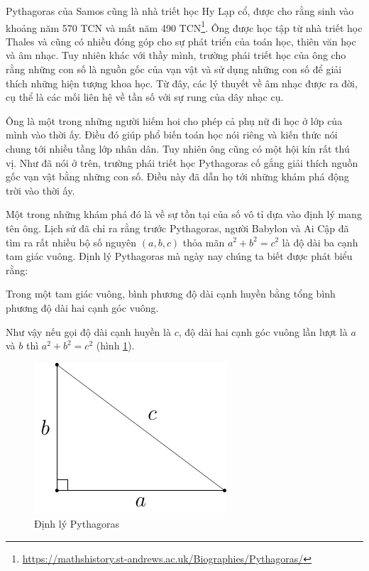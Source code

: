 Pythagoras của Samos cũng là nhà triết học Hy Lạp cổ, được cho rằng sinh vào khoảng năm 570 TCN và mất năm  490 TCN\footnote{\url{https://mathshistory.st-andrews.ac.uk/Biographies/Pythagoras/}}. Ông được học tập từ nhà triết học Thales và cũng có nhiều đóng góp cho sự phát triển của toán học, thiên văn học và âm nhạc. Tuy nhiên khác với thầy mình, trường phái triết học của ông cho rằng những con số là nguồn gốc của vạn vật và sử dụng những con số để giải thích những hiện tượng khoa học. Từ đây, các lý thuyết về âm nhạc được ra đời, cụ thể là các mối liên hệ về tần số với sự rung của dây nhạc cụ.

Ông là một trong những người hiếm hoi cho phép cả phụ nữ đi học ở lớp của mình vào thời ấy. Điều đó giúp phổ biến toán học nói riêng và kiến thức nói chung tới nhiều tầng lớp nhân dân. Tuy nhiên ông cũng có một hội kín rất thú vị. Như đã nói ở trên, trường phái triết học Pythagoras cố gắng giải thích nguồn gốc vạn vật bằng những con số. Điều này đã dẫn họ tới những khám phá động trời vào thời ấy.

Một trong những khám phá đó là về sự tồn tại của số vô tỉ dựa vào định lý mang tên ông. Lịch sử đã chỉ ra rằng trước Pythagoras, người Babylon và Ai Cập đã tìm ra rất nhiều bộ số nguyên $(a, b, c)$ thỏa mãn $a^2 + b^2 = c^2$ là độ dài ba cạnh tam giác vuông. Định lý Pythagoras mà ngày nay chúng ta biết được phát biểu rằng:

\begin{theorem}
    Trong một tam giác vuông, bình phương độ dài cạnh huyền bằng tổng bình phương độ dài hai cạnh góc vuông.
\end{theorem}

Như vậy nếu gọi độ dài cạnh huyền là $c$, độ dài hai cạnh góc vuông lần lượt là $a$ và $b$ thì $a^2 + b^2 = c^2$ (hình \ref{pythagoras1}).

\begin{figure}[ht]
	\centering
	\includegraphics{analytic_geometry/pythagoras_theorem.pdf}
	\caption{Định lý Pythagoras}
	\label{pythagoras1}
\end{figure}

